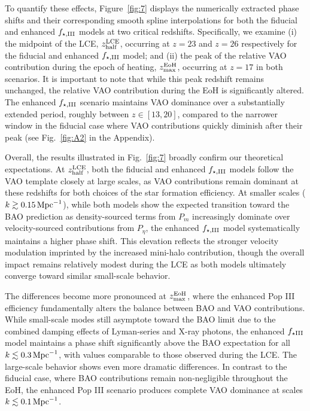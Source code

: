\documentclass[floats,floatfix,showpacs,amssymb,prd,twocolumn,superscriptaddress,nofootinbib,reprint,preprintnumbers]{revtex4-2}
\begin{document}
To quantify these effects, Figure~\ref{fig:7} displays the numerically extracted phase shifts and their corresponding smooth spline interpolations for both the fiducial and enhanced $f_{\star,\rm III}$ models at two critical redshifts.  Specifically, we examine (i) the midpoint of the LCE, $z_{\rm half}^{\rm LCE}$, occurring at $z=23$ and $z=26$ respectively for the fiducial and enhanced $f_{\star,\rm III}$ model; and (ii) the peak of the relative VAO contribution during the epoch of heating, $z_{\rm max}^{\rm EoH}$, occurring at $z=17$ in both scenarios. It is important to note that while this peak redshift remains unchanged, the relative VAO contribution during the EoH is significantly altered. The enhanced $f_{\star,\rm III}$ scenario maintains VAO dominance over a substantially extended period, roughly between $z\in[13,20]$, compared to the narrower window in the fiducial case where VAO contributions quickly diminish after their peak (see Fig.~\ref{fig:A2} in the Appendix).

Overall, the results illustrated in Fig.~\ref{fig:7} broadly confirm our theoretical expectations. At $z_{\rm half}^{\rm LCE}$, both the fiducial and enhanced $f_{\star,\rm III}$ models follow the VAO template closely at large scales, as VAO contributions remain dominant at these redshifts for both choices of the star formation efficiency. At smaller scales ($k \gtrsim 0.15\,\rm{Mpc}^{-1}$), while both models show the expected transition toward the BAO prediction as density-sourced terms from $P_m$ increasingly dominate over velocity-sourced contributions from $P_\eta$, the enhanced $f_{\star,\rm III}$ model systematically maintains  a higher phase shift. This elevation reflects the stronger velocity modulation imprinted by the increased mini-halo contribution, though the overall impact remains relatively modest during the LCE as both models ultimately converge toward similar small-scale behavior.

The differences become more pronounced at $z_{\rm max}^{\rm EoH}$, where the enhanced Pop III efficiency fundamentally alters the balance between BAO and VAO contributions. While small-scale modes still asymptote toward the BAO limit due to the combined damping effects of Lyman-series and X-ray photons, the enhanced $f_{\star \rm III}$ model maintains a phase shift significantly above the BAO expectation for all $k \lesssim 0.3\,\rm{Mpc}^{-1}$, with values comparable to those observed during the LCE. The large-scale behavior shows even more dramatic differences. In contrast to the fiducial case, where BAO contributions remain non-negligible throughout the EoH, the enhanced Pop III scenario produces complete VAO dominance at scales $k \lesssim 0.1\,\rm{Mpc}^{-1}$. 
\end{document}

